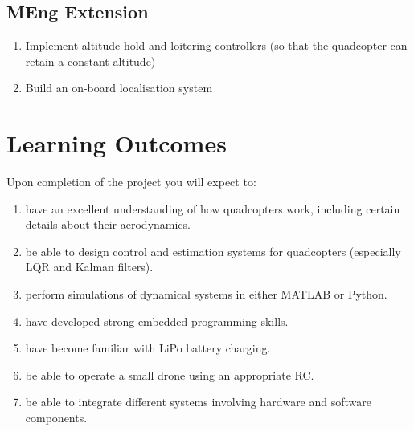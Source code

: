 \subsection*{MEng Extension}
\begin{enumerate}
    \setlength\itemsep{-0.5em}
    \item Implement altitude hold and loitering controllers (so that the quadcopter can retain a constant altitude)
    \item Build an on-board localisation system
\end{enumerate}

\section*{Learning Outcomes}
Upon completion of the project you will expect to:
\begin{enumerate}
    \setlength\itemsep{-0.5em}
    \item have an excellent understanding of how quadcopters work, including certain details about their aerodynamics.
    \item be able to design control and estimation systems for quadcopters (especially LQR and Kalman filters).
    \item perform simulations of dynamical systems in either MATLAB or Python.
    \item have developed strong embedded programming skills.
    \item have become familiar with LiPo battery charging.
    \item be able to operate a small drone using an appropriate RC.
    \item be able to integrate different systems involving hardware and software components.
\end{enumerate}
